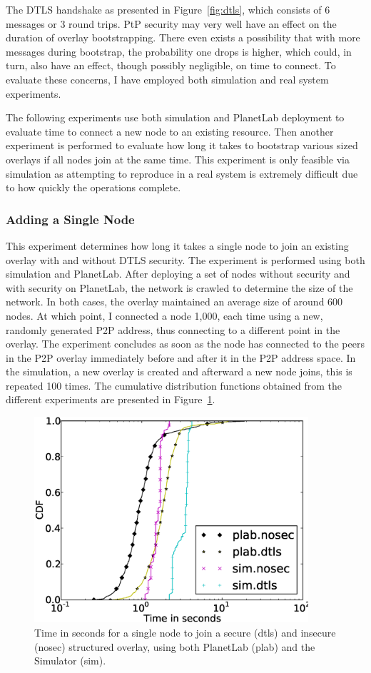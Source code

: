 The DTLS handshake as presented in Figure~\ref{fig:dtls}, which consists of 6
messages or 3 round trips.  PtP security may very well have an effect on the
duration of overlay bootstrapping.  There even exists a possibility that with
more messages during bootstrap, the probability one drops is higher, which
could, in turn, also have an effect, though possibly negligible, on time to
connect.  To evaluate these concerns, I have employed both simulation and real
system experiments.

The following experiments use both simulation and PlanetLab deployment to
evaluate time to connect a new node to an existing resource.  Then another
experiment is performed to evaluate how long it takes to bootstrap various
sized overlays if all nodes join at the same time.  This experiment is only
feasible via simulation as attempting to reproduce in a real system is
extremely difficult due to how quickly the operations complete.

\subsubsection{Adding a Single Node}

This experiment determines how long it takes a single node to join an existing
overlay with and without DTLS security.  The experiment is performed using both
simulation and PlanetLab.  After deploying a set of nodes without security and
with security on PlanetLab, the network is crawled to determine the size of the
network.  In both cases, the overlay maintained an average size of around 600
nodes.  At which point, I connected a node 1,000, each time using a new,
randomly generated P2P address, thus connecting to a different point in the
overlay.  The experiment concludes as soon as the node has connected to the
peers in the P2P overlay immediately before and after it in the P2P address
space.  In the simulation, a new overlay is created and afterward a new node
joins, this is repeated 100 times.  The cumulative distribution functions
obtained from the different experiments are presented in
Figure~\ref{fig:add_one}.

\begin{figure}[ht]
\centering
\includegraphics[width=4in]{figs/addone.eps}
\caption[Joining a secure overlay]{Time in seconds for a single node to join a
secure (dtls) and insecure (nosec) structured overlay, using both PlanetLab
(plab) and the Simulator (sim).} \label{fig:add_one}
\end{figure}

